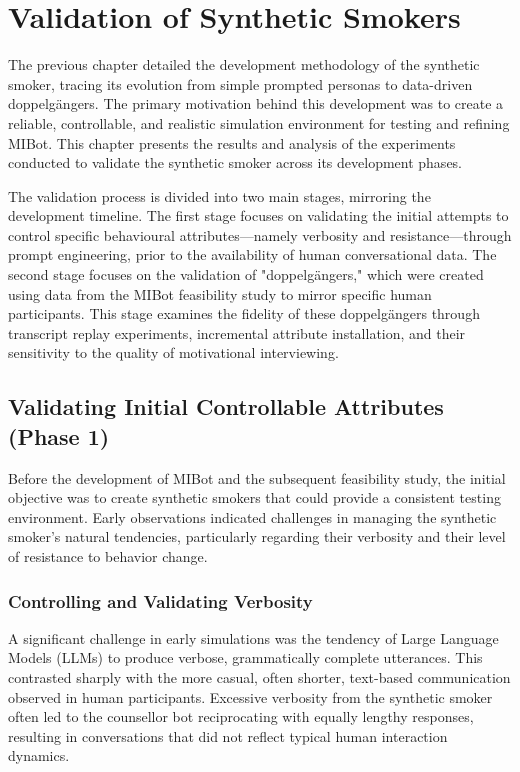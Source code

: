 \chapter{Validation of Synthetic Smokers}
\label{sec:synethetic-smoker-eval}

The previous chapter detailed the development methodology of the synthetic smoker, tracing its evolution from simple prompted personas to data-driven doppelgängers. The primary motivation behind this development was to create a reliable, controllable, and realistic simulation environment for testing and refining MIBot. This chapter presents the results and analysis of the experiments conducted to validate the synthetic smoker across its development phases.

The validation process is divided into two main stages, mirroring the development timeline. The first stage focuses on validating the initial attempts to control specific behavioural attributes—namely verbosity and resistance—through prompt engineering, prior to the availability of human conversational data. The second stage focuses on the validation of "doppelgängers," which were created using data from the MIBot feasibility study to mirror specific human participants. This stage examines the fidelity of these doppelgängers through transcript replay experiments, incremental attribute installation, and their sensitivity to the quality of motivational interviewing.

\section{Validating Initial Controllable Attributes (Phase 1)}

Before the development of MIBot and the subsequent feasibility study, the initial objective was to create synthetic smokers that could provide a consistent testing environment. Early observations indicated challenges in managing the synthetic smoker's natural tendencies, particularly regarding their verbosity and their level of resistance to behavior change.

\subsection{Controlling and Validating Verbosity}

A significant challenge in early simulations was the tendency of Large Language Models (LLMs) to produce verbose, grammatically complete utterances. This contrasted sharply with the more casual, often shorter, text-based communication observed in human participants. Excessive verbosity from the synthetic smoker often led to the counsellor bot reciprocating with equally lengthy responses, resulting in conversations that did not reflect typical human interaction dynamics.

